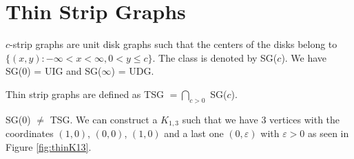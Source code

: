 
\section{Thin Strip Graphs}
\label{sec:thin}


$c$-strip graphs are unit disk graphs such that the centers of the disks belong to
$\{(x,y) : -\infty < x < \infty, 0 < y \leq c\}$. The class is denoted by SG($c$). We
have SG(0) = UIG and SG($\infty$) = UDG. \cite{hayashiThinStripGraphs2017}

\begin{defn}
  Thin strip graphs are defined as TSG $= \bigcap_{c > 0}$ SG($c$).
\end{defn}

\begin{remark}
  SG($0$) $\neq$ TSG. We can construct a $K_{1,3}$ such that we have 3 vertices with the coordinates
  $(1,0)$, $(0,0)$, $(1,0)$ and a last one $(0,\varepsilon)$ with $\varepsilon > 0$ as seen in Figure \ref{fig:thinK13}.
\end{remark}


